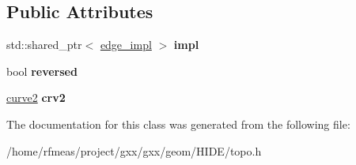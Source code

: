 \subsection*{Public Attributes}
\begin{DoxyCompactItemize}
\item 
std\+::shared\+\_\+ptr$<$ \hyperlink{classgxx_1_1topo_1_1edge__impl}{edge\+\_\+impl} $>$ {\bfseries impl}\hypertarget{classgxx_1_1topo_1_1edge_a508f6ace00fd8388a5400ceb56259273}{}\label{classgxx_1_1topo_1_1edge_a508f6ace00fd8388a5400ceb56259273}

\item 
bool {\bfseries reversed}\hypertarget{classgxx_1_1topo_1_1edge_a2ba946bfa9a585bfac46f16146a0ce51}{}\label{classgxx_1_1topo_1_1edge_a2ba946bfa9a585bfac46f16146a0ce51}

\item 
\hyperlink{classgxx_1_1geom2_1_1curve}{curve2} {\bfseries crv2}\hypertarget{classgxx_1_1topo_1_1edge_a9dbe0e80384c75c6a13151b898a68f5d}{}\label{classgxx_1_1topo_1_1edge_a9dbe0e80384c75c6a13151b898a68f5d}

\end{DoxyCompactItemize}


The documentation for this class was generated from the following file\+:\begin{DoxyCompactItemize}
\item 
/home/rfmeas/project/gxx/gxx/geom/\+H\+I\+D\+E/topo.\+h\end{DoxyCompactItemize}
